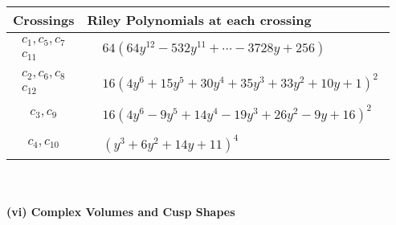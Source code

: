 \documentclass[1p]{elsarticle_modified}
\theoremstyle{definition}
\begin{document}
\begin{tabular}{m{50pt}|m{274pt}}
Crossings & \hspace{64pt}Riley Polynomials at each crossing \\
\hline $$\begin{aligned}c_{1},c_{5},c_{7}\\c_{11}\end{aligned}$$&$\begin{aligned}
&64(64 y^{12}-532 y^{11}+\cdots-3728 y+256)
\end{aligned}$\\
\hline $$\begin{aligned}c_{2},c_{6},c_{8}\\c_{12}\end{aligned}$$&$\begin{aligned}
&16(4 y^6+15 y^5+30 y^4+35 y^3+33 y^2+10 y+1)^2
\end{aligned}$\\
\hline $$\begin{aligned}c_{3},c_{9}\end{aligned}$$&$\begin{aligned}
&16(4 y^6-9 y^5+14 y^4-19 y^3+26 y^2-9 y+16)^2
\end{aligned}$\\
\hline $$\begin{aligned}c_{4},c_{10}\end{aligned}$$&$\begin{aligned}
&(y^3+6 y^2+14 y+11)^4
\end{aligned}$\\
\hline
\end{tabular}\\~\\
\newpage\flushleft \textbf{(vi) Complex Volumes and Cusp Shapes}
\end{document}
